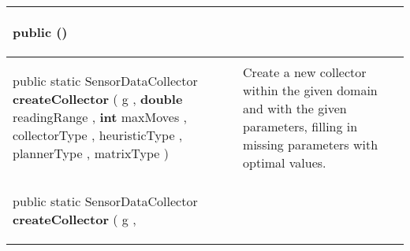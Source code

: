 {\vspace*{-5pt} 
\begin{tabularx}{\linewidth}{X|m{}}
\label{tab:SensorDataCollectorFactory}
\begin{raggedleft}public  \textbf{\hyperref[tab:SensorDataCollectorFactory]{\color{blue}{SensorDataCollectorFactory}}}()
\end{raggedleft} &
 \\ \hline 
\begin{raggedleft}public static SensorDataCollector \textbf{createCollector }(\newline \hfill 
\hspace*{ 5pt} \textbf{\hyperref[tab:ConstrainedTreeGraph]{\color{blue}{ConstrainedTreeGraph}}} g , \newline
 \hspace*{ 5pt} \textbf{double} readingRange , \newline
 \hspace*{ 5pt} \textbf{int} maxMoves , \newline
 \hspace*{ 5pt} \textbf{\hyperref[tab:SensorDataCollectorFactory.CollectorType]{\color{blue}{CollectorType}}} collectorType , \newline
 \hspace*{ 5pt} \textbf{\hyperref[tab:SensorDataCollectorFactory.PathfindingHeuristicType]{\color{blue}{PathfindingHeuristicType}}} heuristicType , \newline
 \hspace*{ 5pt} \textbf{\hyperref[tab:SensorDataCollectorFactory.CollectionOrderPlannerType]{\color{blue}{CollectionOrderPlannerType}}} plannerType , \newline
 \hspace*{ 5pt} \textbf{\hyperref[tab:SensorDataCollectorFactory.DistanceMatrixType]{\color{blue}{DistanceMatrixType}}} matrixType  )
\end{raggedleft} &
 Create a new collector within the given domain and with the given parameters, filling in missing parameters with optimal values.\\ \hline 
\begin{raggedleft}public static SensorDataCollector \textbf{createCollector }(\newline \hfill 
\hspace*{ 5pt} \textbf{\hyperref[tab:ConstrainedTreeGraph]{\color{blue}{ConstrainedTreeGraph}}} g , \newline

\end{raggedleft}
\end{tabularx}}
